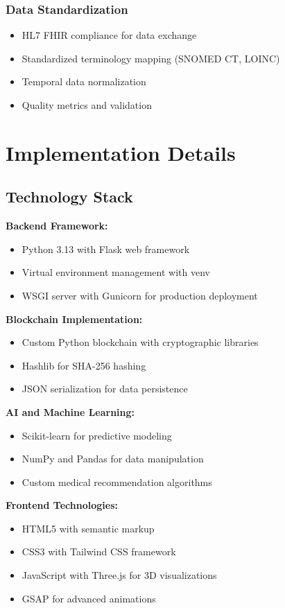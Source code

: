 \documentclass[12pt,a4paper]{article}
\begin{document}
\subsubsection{Data Standardization}
\begin{itemize}
    \item HL7 FHIR compliance for data exchange
    \item Standardized terminology mapping (SNOMED CT, LOINC)
    \item Temporal data normalization
    \item Quality metrics and validation
\end{itemize}

\section{Implementation Details}

\subsection{Technology Stack}

\textbf{Backend Framework:}
\begin{itemize}
    \item Python 3.13 with Flask web framework
    \item Virtual environment management with venv
    \item WSGI server with Gunicorn for production deployment
\end{itemize}

\textbf{Blockchain Implementation:}
\begin{itemize}
    \item Custom Python blockchain with cryptographic libraries
    \item Hashlib for SHA-256 hashing
    \item JSON serialization for data persistence
\end{itemize}

\textbf{AI and Machine Learning:}
\begin{itemize}
    \item Scikit-learn for predictive modeling
    \item NumPy and Pandas for data manipulation
    \item Custom medical recommendation algorithms
\end{itemize}

\textbf{Frontend Technologies:}
\begin{itemize}
    \item HTML5 with semantic markup
    \item CSS3 with Tailwind CSS framework
    \item JavaScript with Three.js for 3D visualizations
    \item GSAP for advanced animations
\end{itemize}
\end{document}
